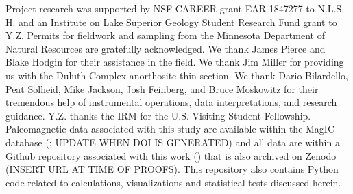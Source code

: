 \documentclass[draft]{agujournal2019}
\begin{document}
\acknowledgments
Project research was supported by NSF CAREER grant EAR-1847277 to N.L.S.-H. and an Institute on Lake Superior Geology Student Research Fund grant to Y.Z. Permits for fieldwork and sampling from the Minnesota Department of Natural Resources are gratefully acknowledged. We thank James Pierce and Blake Hodgin for their assistance in the field. We thank Jim Miller for providing us with the Duluth Complex anorthosite thin section. We thank Dario Bilardello, Peat Solheid, Mike Jackson, Josh Feinberg, and Bruce Moskowitz for their tremendous help of instrumental operations, data interpretations, and research guidance. Y.Z. thanks the IRM for the U.S. Visiting Student Fellowship. Paleomagnetic data associated with this study are available within the MagIC database (\url{}; UPDATE WHEN DOI IS GENERATED) and all data are within a Github repository associated with this work (\url{}) that is also archived on Zenodo (INSERT URL AT TIME OF PROOFS). This repository also contains Python code related to calculations, visualizations and statistical tests discussed herein.  

\end{document}

